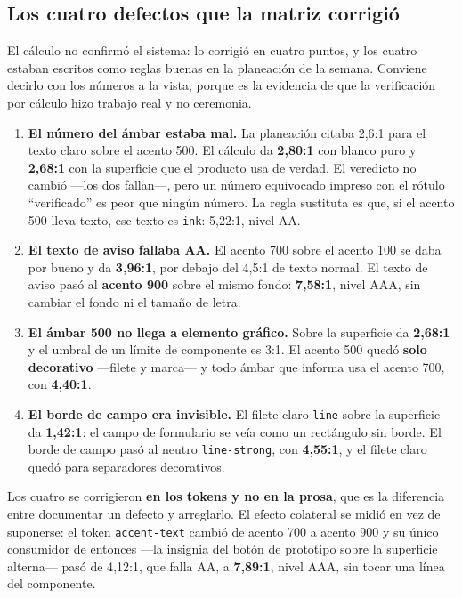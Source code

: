 \laminaContraste

\subsection{Los cuatro defectos que la matriz corrigió}

El cálculo no confirmó el sistema: lo corrigió en cuatro puntos, y los cuatro estaban escritos como reglas buenas en la planeación de la semana. Conviene decirlo con los números a la vista, porque es la evidencia de que la verificación por cálculo hizo trabajo real y no ceremonia.

\begin{enumerate}[leftmargin=*,itemsep=5pt,topsep=6pt]
\item \textbf{El número del ámbar estaba mal.} La planeación citaba 2{,}6:1 para el texto claro sobre el acento 500. El cálculo da \textbf{2{,}80:1} con blanco puro y \textbf{2{,}68:1} con la superficie que el producto usa de verdad. El veredicto no cambió ---los dos fallan---, pero un número equivocado impreso con el rótulo \enquote{verificado} es peor que ningún número. La regla sustituta es que, si el acento 500 lleva texto, ese texto es \texttt{ink}: 5{,}22:1, nivel AA.
\item \textbf{El texto de aviso fallaba AA.} El acento 700 sobre el acento 100 se daba por bueno y da \textbf{3{,}96:1}, por debajo del 4{,}5:1 de texto normal. El texto de aviso pasó al \textbf{acento 900} sobre el mismo fondo: \textbf{7{,}58:1}, nivel AAA, sin cambiar el fondo ni el tamaño de letra.
\item \textbf{El ámbar 500 no llega a elemento gráfico.} Sobre la superficie da \textbf{2{,}68:1} y el umbral de un límite de componente es 3:1. El acento 500 quedó \textbf{solo decorativo} ---filete y marca--- y todo ámbar que informa usa el acento 700, con \textbf{4{,}40:1}.
\item \textbf{El borde de campo era invisible.} El filete claro \texttt{line} sobre la superficie da \textbf{1{,}42:1}: el campo de formulario se veía como un rectángulo sin borde. El borde de campo pasó al neutro \texttt{line-strong}, con \textbf{4{,}55:1}, y el filete claro quedó para separadores decorativos.
\end{enumerate}

Los cuatro se corrigieron \textbf{en los tokens y no en la prosa}, que es la diferencia entre documentar un defecto y arreglarlo. El efecto colateral se midió en vez de suponerse: el token \texttt{accent-text} cambió de acento 700 a acento 900 y su único consumidor de entonces ---la insignia del botón de prototipo sobre la superficie alterna--- pasó de 4{,}12:1, que falla AA, a \textbf{7{,}89:1}, nivel AAA, sin tocar una línea del componente.

